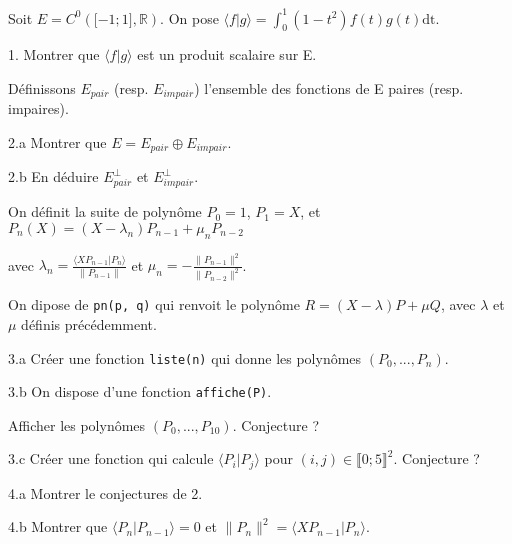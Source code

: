 
\vspace{-10pt}
\noindent Soit $E = C^0\left(\lbrack -1; 1 \rbrack, \mathbb{R} \right).$
          On pose $\displaystyle \langle f|g \rangle = \int_{0}^{1} \left(1-t^2\right)f(t)g(t)\mathrm{dt}$.

\vspace{5pt}
1. Montrer que $\langle f|g \rangle$ est un produit scalaire sur E.

\vspace{5pt}
\noindent Définissons $E_{pair}$ (resp. $E_{impair}$) l'ensemble des fonctions de E paires (resp. impaires).

\vspace{5pt}
2.a Montrer que $E = E_{pair} \oplus E_{impair}$.

\vspace{5pt}
2.b En déduire $E_{pair}^{\perp}$ et $E_{impair}^{\perp}$.

\vspace{10pt}
\noindent On définit la suite de polynôme $P_0 = 1$, $P_1 = X$, et $P_n(X) = (X-\lambda_n)P_{n-1} + \mu_nP_{n-2}$

\vspace{5pt}
\noindent avec $\displaystyle \lambda_n = \frac {\langle XP_{n-1} | P_n \rangle} {\|P_{n-1}\|}$
          et $\displaystyle \mu_n = - \frac {\| P_{n-1} \|^2} {\| P_{n-2} \|^2}$.

\vspace{5pt}
\noindent On dipose de \lstinline {pn(p, q)} qui renvoit le polynôme $R = (X - \lambda)P + \mu Q$, avec $\lambda$ et $\mu$ définis précédemment.

\vspace{5pt}
3.a Créer une fonction \lstinline {liste(n)} qui donne les polynômes $(P_0, ..., P_n)$.

\vspace{5pt}
3.b On dispose d'une fonction \lstinline {affiche(P)}.

Afficher les polynômes $(P_0, ..., P_{10})$. Conjecture ?

\vspace{5pt}
3.c Créer une fonction qui calcule $\langle P_i|P_j \rangle$ pour $(i, j) \in \llbracket 0;5 \rrbracket^2$. Conjecture ?

\vspace{5pt}
4.a Montrer le conjectures de 2.

\vspace{5pt}
4.b Montrer que $\langle P_n | P_{n-1} \rangle = 0$ et $\|P_n\|^2 = \langle XP_{n-1} | P_n \rangle$.

